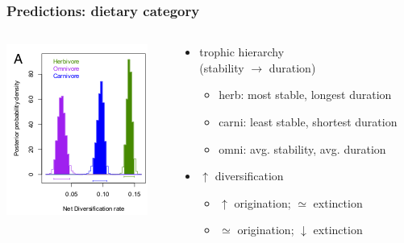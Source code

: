\documentclass{beamer} \usepackage{amsmath,amsthm}
\begin{document}
\begin{frame}
  \frametitle{Predictions: dietary category}
  \begin{columns}
    \begin{column}{0.5\textwidth}
      \includegraphics[height=0.8\textheight, width=\textwidth, keepaspectratio=true]{figure/dietdiv}

      \tiny{}
    \end{column}
    \begin{column}{0.5\textwidth}
      \begin{itemize}
        \item trophic hierarchy \\(stability \(\to\) duration)
          \begin{itemize}
            \item herb: most stable, longest duration
            \item carni: least stable, shortest duration
            \item omni: avg. stability, avg. duration
          \end{itemize}
        \item \(\uparrow\) diversification
          \begin{itemize}
            \item \(\uparrow\) origination; \(\simeq\) extinction
            \item \(\simeq\) origination; \(\downarrow\) extinction
          \end{itemize}
      \end{itemize}
    \end{column}
  \end{columns}
\end{frame}
\end{document}
